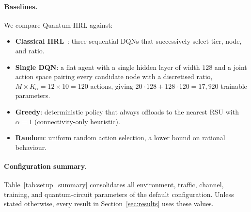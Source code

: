 \documentclass[11pt,a4paper]{article}
\theoremstyle{definition}
\begin{document}
\paragraph{Baselines.}
We compare Quantum-HRL against:
\begin{itemize}
  \item \textbf{Classical HRL}~\cite{hrl_ntn}: three sequential DQNs that successively select tier, node, and ratio.
  \item \textbf{Single DQN}: a flat agent with a single hidden layer of width $128$ and a joint action space pairing every candidate node with a discretised ratio, $M\!\times\!K_\alpha = 12\!\times\!10 = 120$ actions, giving $20\!\cdot\!128 + 128\!\cdot\!120 = 17{,}920$ trainable parameters.
  \item \textbf{Greedy}: deterministic policy that always offloads to the nearest RSU with $\alpha{=}1$ (connectivity-only heuristic).
  \item \textbf{Random}: uniform random action selection, a lower bound on rational behaviour.
\end{itemize}

\paragraph{Configuration summary.}
Table~\ref{tab:setup_summary} consolidates all environment, traffic, channel, training, and quantum-circuit parameters of the default configuration. Unless stated otherwise, every result in Section~\ref{sec:results} uses these values.
\end{document}
